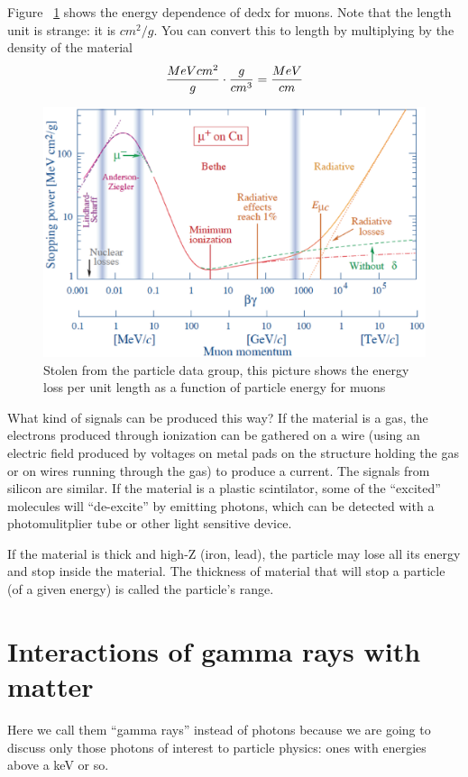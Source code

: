 Figure ~\ref{fig:pdgdedx} shows the energy dependence of dedx for muons.  Note that the length unit is strange: it is $cm^2/g$.  You can convert this to length by multiplying by the density of the material
\begin{equation}
{{MeV cm^2}\over{g}} \cdot {{g}\over{cm^3}} = {{MeV}\over{cm}}
\end{equation}

\begin{figure}[h]
\centering\includegraphics[scale=0.5]{./particleinteractions/Pictures/dedx.eps}
\caption{Stolen from the particle data group, this picture shows the energy
loss per unit length as a function of particle energy for muons}
\label{fig:pdgdedx}
\end{figure}

What kind of signals can be produced this way?  If the material is a gas, the electrons produced through ionization can be gathered on a wire (using an electric field produced by voltages on metal pads on the structure holding the gas or on wires running through the gas) to produce a current.  The signals from silicon are similar.  If the material is a plastic scintilator, some of the ``excited'' molecules will ``de-excite'' by emitting photons, which can be detected with a photomulitplier tube or other light sensitive device.

If the material is thick and high-Z (iron, lead), the particle may lose all its energy and 
stop inside the material.  The thickness of material that will stop a particle (of a given energy) is called the particle's range.


\section{Interactions of gamma rays with matter}

Here we call them “gamma rays” instead of photons because we are going to discuss only those photons of interest to particle physics: ones with energies above a keV or so.



